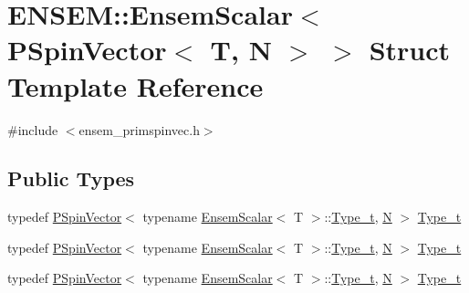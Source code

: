 \hypertarget{structENSEM_1_1EnsemScalar_3_01PSpinVector_3_01T_00_01N_01_4_01_4}{}\section{E\+N\+S\+EM\+:\+:Ensem\+Scalar$<$ P\+Spin\+Vector$<$ T, N $>$ $>$ Struct Template Reference}
\label{structENSEM_1_1EnsemScalar_3_01PSpinVector_3_01T_00_01N_01_4_01_4}


{\ttfamily \#include $<$ensem\+\_\+primspinvec.\+h$>$}

\subsection*{Public Types}
\begin{DoxyCompactItemize}
\item 
typedef \mbox{\hyperlink{classENSEM_1_1PSpinVector}{P\+Spin\+Vector}}$<$ typename \mbox{\hyperlink{structENSEM_1_1EnsemScalar}{Ensem\+Scalar}}$<$ T $>$\+::\mbox{\hyperlink{structENSEM_1_1EnsemScalar_3_01PSpinVector_3_01T_00_01N_01_4_01_4_aef6767dcaa0dee58e84534fb1554dd11}{Type\+\_\+t}}, \mbox{\hyperlink{adat__devel_2lib_2hadron_2operator__name__util_8cc_a7722c8ecbb62d99aee7ce68b1752f337}{N}} $>$ \mbox{\hyperlink{structENSEM_1_1EnsemScalar_3_01PSpinVector_3_01T_00_01N_01_4_01_4_aef6767dcaa0dee58e84534fb1554dd11}{Type\+\_\+t}}
\item 
typedef \mbox{\hyperlink{classENSEM_1_1PSpinVector}{P\+Spin\+Vector}}$<$ typename \mbox{\hyperlink{structENSEM_1_1EnsemScalar}{Ensem\+Scalar}}$<$ T $>$\+::\mbox{\hyperlink{structENSEM_1_1EnsemScalar_3_01PSpinVector_3_01T_00_01N_01_4_01_4_aef6767dcaa0dee58e84534fb1554dd11}{Type\+\_\+t}}, \mbox{\hyperlink{adat__devel_2lib_2hadron_2operator__name__util_8cc_a7722c8ecbb62d99aee7ce68b1752f337}{N}} $>$ \mbox{\hyperlink{structENSEM_1_1EnsemScalar_3_01PSpinVector_3_01T_00_01N_01_4_01_4_aef6767dcaa0dee58e84534fb1554dd11}{Type\+\_\+t}}
\item 
typedef \mbox{\hyperlink{classENSEM_1_1PSpinVector}{P\+Spin\+Vector}}$<$ typename \mbox{\hyperlink{structENSEM_1_1EnsemScalar}{Ensem\+Scalar}}$<$ T $>$\+::\mbox{\hyperlink{structENSEM_1_1EnsemScalar_3_01PSpinVector_3_01T_00_01N_01_4_01_4_aef6767dcaa0dee58e84534fb1554dd11}{Type\+\_\+t}}, \mbox{\hyperlink{adat__devel_2lib_2hadron_2operator__name__util_8cc_a7722c8ecbb62d99aee7ce68b1752f337}{N}} $>$ \mbox{\hyperlink{structENSEM_1_1EnsemScalar_3_01PSpinVector_3_01T_00_01N_01_4_01_4_aef6767dcaa0dee58e84534fb1554dd11}{Type\+\_\+t}}
\end{DoxyCompactItemize}



